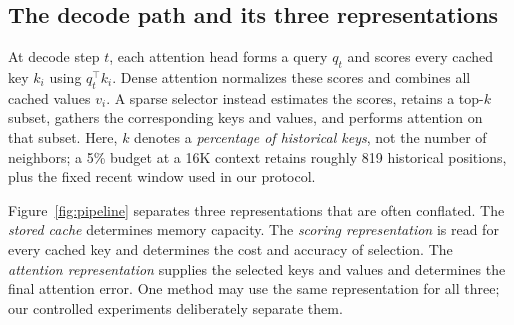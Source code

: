 \documentclass[sigplan,anonymous,review,nonacm]{acmart}
\begin{document}
\subsection{The decode path and its three representations}
At decode step $t$, each attention head forms a query $q_t$ and scores every cached
key $k_i$ using $q_t^\top k_i$. Dense attention normalizes these scores and combines
all cached values $v_i$. A sparse selector instead estimates the scores, retains a
top-$k$ subset, gathers the corresponding keys and values, and performs attention on
that subset. Here, $k$ denotes a \emph{percentage of historical keys}, not the number
of neighbors; a 5\% budget at a 16K context retains roughly 819 historical positions,
plus the fixed recent window used in our protocol.

Figure~\ref{fig:pipeline} separates three representations that are often conflated.
The \emph{stored cache} determines memory capacity. The \emph{scoring representation}
is read for every cached key and determines the cost and accuracy of selection. The
\emph{attention representation} supplies the selected keys and values and determines
the final attention error. One method may use the same representation for all three;
our controlled experiments deliberately separate them.
\end{document}
